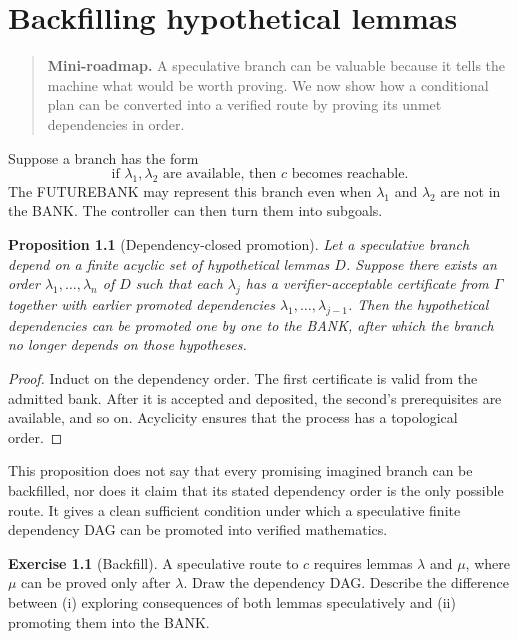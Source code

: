 \documentclass[11pt,openany]{book}
\newtheorem{proposition}[theorem]{Proposition}
\theoremstyle{definition}
\newtheorem{exercise}[theorem]{Exercise}
\theoremstyle{remark}
\newenvironment{miniroadmap}{\begin{quote}\small\color{deepblue}\textbf{Mini-roadmap.} }{\end{quote}}
\begin{document}
\chapter{Backfilling hypothetical lemmas}
\begin{miniroadmap}
A speculative branch can be valuable because it tells the machine what would be worth proving. We now show how a conditional plan can be converted into a verified route by proving its unmet dependencies in order.
\end{miniroadmap}

Suppose a branch has the form
\[
\text{if }\lambda_1,\lambda_2\text{ are available, then }c\text{ becomes reachable}.
\]
The FUTUREBANK may represent this branch even when $\lambda_1$ and $\lambda_2$ are not in the BANK. The controller can then turn them into subgoals.

\begin{proposition}[Dependency-closed promotion]\label{prop:backfill}
Let a speculative branch depend on a finite acyclic set of hypothetical lemmas $D$. Suppose there exists an order $\lambda_1,\ldots,\lambda_n$ of $D$ such that each $\lambda_j$ has a verifier-acceptable certificate from $\Gamma$ together with earlier promoted dependencies $\lambda_1,\ldots,\lambda_{j-1}$. Then the hypothetical dependencies can be promoted one by one to the BANK, after which the branch no longer depends on those hypotheses.
\end{proposition}
\begin{proof}
Induct on the dependency order. The first certificate is valid from the admitted bank. After it is accepted and deposited, the second's prerequisites are available, and so on. Acyclicity ensures that the process has a topological order.
\end{proof}

This proposition does not say that every promising imagined branch can be backfilled, nor does it claim that its stated dependency order is the only possible route. It gives a clean sufficient condition under which a speculative finite dependency DAG can be promoted into verified mathematics.

\begin{exercise}[Backfill]\label{ex:backfill}
A speculative route to $c$ requires lemmas $\lambda$ and $\mu$, where $\mu$ can be proved only after $\lambda$. Draw the dependency DAG. Describe the difference between (i) exploring consequences of both lemmas speculatively and (ii) promoting them into the BANK.
\end{exercise}
\end{document}
